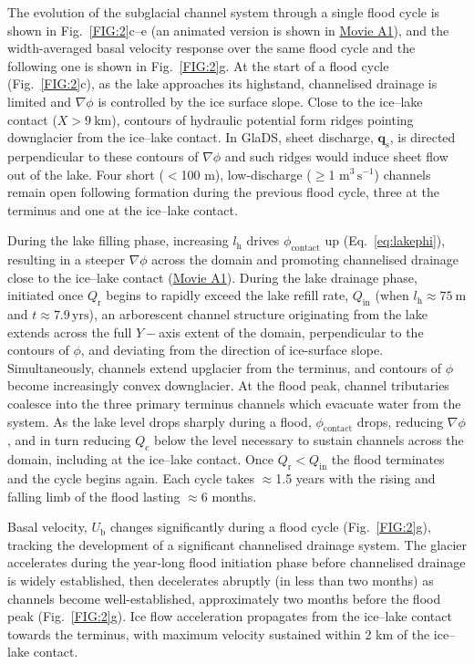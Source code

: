 \documentclass[tc, manuscript]{copernicus}
\begin{document}
The evolution of the subglacial channel system through a single flood cycle is shown in Fig.~\ref{FIG:2}c--e (an animated version is shown in \hyperref[Apfig:SuppMovie]{Movie A1}), and the width-averaged basal velocity response over the same flood cycle and the following one is shown in Fig.~\ref{FIG:2}g. At the start of a flood cycle (Fig.~\ref{FIG:2}c), as the lake approaches its highstand, channelised drainage is limited and $\nabla\phi$ is controlled by the ice surface slope. Close to the ice--lake contact ($X > \mathrm{9\ km}$), contours of hydraulic potential form ridges pointing downglacier from the ice--lake contact. In GlaDS, sheet discharge, $\mathbf{q}_{\mathrm{s}}$, is directed perpendicular to these contours of $\nabla\phi$ and such ridges would induce sheet flow out of the lake. Four short ($<$100 m), low-discharge ($\geq$1 m$^{3}\,\mathrm{s}^{-1}$) channels remain open following formation during the previous flood cycle, three at the terminus and one at the ice--lake contact.

During the lake filling phase, increasing $l_\mathrm{{h}}$ drives $\phi_{\mathrm{contact}}$ up (Eq.~\ref{eq:lakephi}), resulting in a steeper $\nabla \phi$ across the domain and promoting channelised drainage close to the ice--lake contact (\hyperref[Apfig:SuppMovie]{Movie A1}). During the lake drainage phase, initiated once $Q_{\mathrm{r}}$ begins to rapidly exceed the lake refill rate, $Q_{\mathrm{in}}$ (when $l_\mathrm{{h}} \approx \mathrm{75\ m}$ and $t \approx \mathrm{7.9 \, yrs}$), an arborescent channel structure originating from the lake extends across the full $Y-$axis extent of the domain, perpendicular to the contours of $\phi$, and deviating from the direction of ice-surface slope. Simultaneously, channels extend upglacier from the terminus, and contours of $\phi$ become increasingly convex downglacier. At the flood peak, channel tributaries coalesce into the three primary terminus channels which evacuate water from the system. As the lake level drops sharply during a flood, $\phi_{\mathrm{contact}}$ drops, reducing $\nabla \phi$, and in turn reducing $Q_{\mathrm{c}}$ below the level necessary to sustain channels across the domain, including at the ice--lake contact. Once $Q_{\mathrm{r}} < Q_{\mathrm{in}}$ the flood terminates and the cycle begins again. Each cycle takes $\approx$1.5 years with the rising and falling limb of the flood lasting $\approx$6 months. 

Basal velocity, $U_{\mathrm{b}}$ changes significantly during a flood cycle (Fig.~\ref{FIG:2}g), tracking the development of a significant channelised drainage system. The glacier accelerates during the year-long flood initiation phase before channelised drainage is widely established, then decelerates abruptly (in less than two months) as channels become well-established, approximately two months before the flood peak (Fig.~\ref{FIG:2}g). Ice flow acceleration propagates from the ice--lake contact towards the terminus, with maximum velocity sustained within 2 km of the ice--lake contact. 
\end{document}
